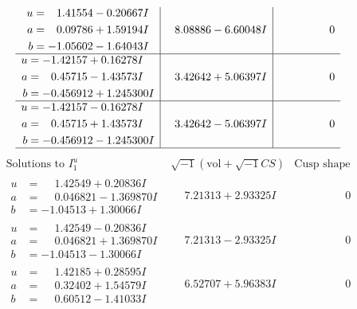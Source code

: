 \documentclass[1p]{elsarticle_modified}
\theoremstyle{definition}
\newcommand{\I}{\sqrt{-1}}
\begin{document}
$$\begin{array}{c|c|c}
\begin{aligned}
u &= \phantom{-}1.41554 - 0.20667 I \\
a &= \phantom{-}0.09786 + 1.59194 I \\
b &= -1.05602 - 1.64043 I\end{aligned}
 & \phantom{-}8.08886 - 6.60048 I & \phantom{-0.000000 } 0 \\ \hline\begin{aligned}
u &= -1.42157 + 0.16278 I \\
a &= \phantom{-}0.45715 - 1.43573 I \\
b &= -0.456912 + 1.245300 I\end{aligned}
 & \phantom{-}3.42642 + 5.06397 I & \phantom{-0.000000 } 0 \\ \hline\begin{aligned}
u &= -1.42157 - 0.16278 I \\
a &= \phantom{-}0.45715 + 1.43573 I \\
b &= -0.456912 - 1.245300 I\end{aligned}
 & \phantom{-}3.42642 - 5.06397 I & \phantom{-0.000000 } 0\\
 \hline 
 \end{array}$$\newpage$$\begin{array}{c|c|c}  
\text{Solutions to }I^u_{1}& \I (\text{vol} + \sqrt{-1}CS) & \text{Cusp shape}\\
 \hline 
\begin{aligned}
u &= \phantom{-}1.42549 + 0.20836 I \\
a &= \phantom{-}0.046821 - 1.369870 I \\
b &= -1.04513 + 1.30066 I\end{aligned}
 & \phantom{-}7.21313 + 2.93325 I & \phantom{-0.000000 } 0 \\ \hline\begin{aligned}
u &= \phantom{-}1.42549 - 0.20836 I \\
a &= \phantom{-}0.046821 + 1.369870 I \\
b &= -1.04513 - 1.30066 I\end{aligned}
 & \phantom{-}7.21313 - 2.93325 I & \phantom{-0.000000 } 0 \\ \hline\begin{aligned}
u &= \phantom{-}1.42185 + 0.28595 I \\
a &= \phantom{-}0.32402 + 1.54579 I \\
b &= \phantom{-}0.60512 - 1.41033 I\end{aligned}
 & \phantom{-}6.52707 + 5.96383 I & \phantom{-0.000000 } 0 \\ \hline\begin{aligned}

\end{aligned}
\end{array}$$
\end{document}
